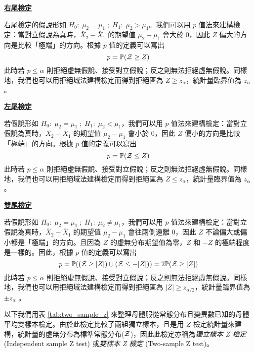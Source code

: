    \noindent\underline{\textbf{右尾檢定}}

    右尾檢定的假說形如 $H_0: \; \mu_2 = \mu_1 \; ; \; H_1: \; \mu_2 > \mu_1$。我們可以用 $p$ 值法來建構檢定：當對立假說為真時，$\bar{X}_2 - \bar{X}_1$ 的期望值 $\mu_2 - \mu_1$ 會大於 0，因此 $Z$ 偏大的方向是比較「極端」的方向。根據 $p$ 值的定義可以寫出
    \[p = \mathbb{P}(\mathcal{Z} \ge Z)\]
    此時若 $p \le \alpha$ 則拒絕虛無假說、接受對立假說；反之則無法拒絕虛無假說。同樣地，我們也可以用拒絕域法建構檢定而得到拒絕區為 $Z \ge z_\alpha$，統計量臨界值為 $z_\alpha$。

    \noindent\underline{\textbf{左尾檢定}}

    若假說形如 $H_0: \; \mu_2 = \mu_1 \; ; \; H_1: \; \mu_2 < \mu_1$，我們可以用 $p$ 值法來建構檢定：當對立假說為真時，$\bar{X}_2 - \bar{X}_1$ 的期望值 $\mu_2 - \mu_1$ 會小於 0，因此 $Z$ 偏小的方向是比較「極端」的方向。根據 $p$ 值的定義可以寫出
    \[p = \mathbb{P}(\mathcal{Z} \le Z)\]
    此時若 $p \le \alpha$ 則拒絕虛無假說、接受對立假說；反之則無法拒絕虛無假說。同樣地，我們也可以用拒絕域法建構檢定而得到拒絕區為 $Z \le z_\alpha$，統計量臨界值為 $z_\alpha$。

    \noindent\underline{\textbf{雙尾檢定}}

    若假說形如 $H_0: \; \mu_2 = \mu_1 \; ; \; H_1: \; \mu_2 \ne \mu_1$，我們可以用 $p$ 值法來建構檢定：當對立假說為真時，$\bar{X}_2 - \bar{X}_1$ 的期望值 $\mu_2 - \mu_1$ 會往兩側遠離 0，因此 $Z$ 不論偏大或偏小都是「極端」的方向。且因為 $Z$ 的虛無分布期望值為零，$Z$ 和 $-Z$ 的極端程度是一樣的。因此，根據 $p$ 值的定義可以寫出
    \[p = \mathbb{P}((\mathcal{Z} \ge |Z|)\cup(\mathcal{Z} \le -|Z|)) = 2\mathbb{P}(\mathcal{Z} \ge |Z|)\]
    此時若 $p \le \alpha$ 則拒絕虛無假說、接受對立假說；反之則無法拒絕虛無假說。同樣地，我們也可以用拒絕域法建構檢定而得到拒絕區為 $|Z| \ge z_{\alpha/2}$，統計量臨界值為 $\pm z_{\alpha}$ 。

    以下我們用表 \ref{tab:two_sample_z} 來整理母體服從常態分布且變異數已知的母體平均雙樣本檢定。由於此檢定比較了兩組獨立樣本，且是用 $Z$ 檢定統計量來建構，統計量的虛無分布為標準常態分布($\mathcal{Z}$)，因此此檢定亦稱為\textit{獨立樣本 Z 檢定} (Independent sample Z test) 或\textit{雙樣本 Z 檢定} (Two-sample Z test)。

